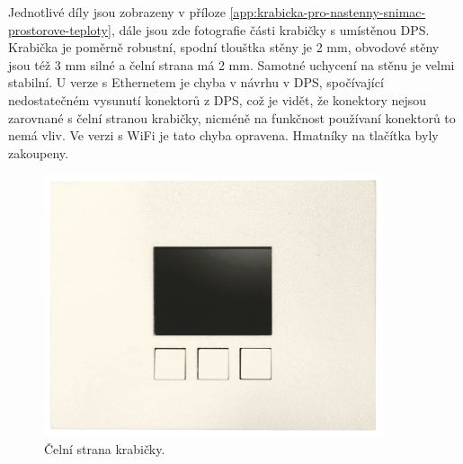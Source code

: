 Jednotlivé díly jsou zobrazeny v příloze \ref{app:krabicka-pro-nastenny-snimac-prostorove-teploty}, dále jsou zde fotografie části krabičky s umístěnou DPS. Krabička je poměrně robustní, spodní tlouštka stěny je 2 mm, obvodové stěny jsou též 3 mm silné a čelní strana má 2 mm. Samotné uchycení na stěnu je velmi stabilní. U verze s Ethernetem je chyba v návrhu v DPS, spočívající nedostatečném vysunutí konektorů z DPS, což je vidět, že konektory nejsou zarovnané s čelní stranou krabičky, nicméně na funkčnost používaní konektorů to nemá vliv. Ve verzi s WiFi je tato chyba opravena. Hmatníky na tlačítka byly zakoupeny.
 
\begin{figure}[H]
    \centering
    \includegraphics[width=0.89\textwidth]{images/krabicka-nastenny-snimac-prostorove-teploty/krabicka-nastenny-snimac-prostorove-teploty-predni-strana-displej.png}
   \caption{Čelní strana krabičky.}
    \label{fig:krabicka-nastenny-snimac-prostorove-teploty-predni-strana-displej}
\end{figure}
